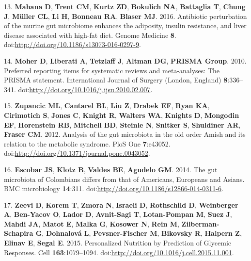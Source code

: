 \documentclass[12pt,]{article}
\begin{document}
13. \textbf{Mahana D}, \textbf{Trent CM}, \textbf{Kurtz ZD},
\textbf{Bokulich NA}, \textbf{Battaglia T}, \textbf{Chung J},
\textbf{Müller CL}, \textbf{Li H}, \textbf{Bonneau RA}, \textbf{Blaser
MJ}. 2016. Antibiotic perturbation of the murine gut microbiome enhances
the adiposity, insulin resistance, and liver disease associated with
high-fat diet. Genome Medicine \textbf{8}.
doi:\url{http://doi.org/10.1186/s13073-016-0297-9}.

14. \textbf{Moher D}, \textbf{Liberati A}, \textbf{Tetzlaff J},
\textbf{Altman DG}, \textbf{PRISMA Group}. 2010. Preferred reporting
items for systematic reviews and meta-analyses: The PRISMA statement.
International Journal of Surgery (London, England) \textbf{8}:336--341.
doi:\url{http://doi.org/10.1016/j.ijsu.2010.02.007}.

15. \textbf{Zupancic ML}, \textbf{Cantarel BL}, \textbf{Liu Z},
\textbf{Drabek EF}, \textbf{Ryan KA}, \textbf{Cirimotich S},
\textbf{Jones C}, \textbf{Knight R}, \textbf{Walters WA},
\textbf{Knights D}, \textbf{Mongodin EF}, \textbf{Horenstein RB},
\textbf{Mitchell BD}, \textbf{Steinle N}, \textbf{Snitker S},
\textbf{Shuldiner AR}, \textbf{Fraser CM}. 2012. Analysis of the gut
microbiota in the old order Amish and its relation to the metabolic
syndrome. PloS One \textbf{7}:e43052.
doi:\url{http://doi.org/10.1371/journal.pone.0043052}.

16. \textbf{Escobar JS}, \textbf{Klotz B}, \textbf{Valdes BE},
\textbf{Agudelo GM}. 2014. The gut microbiota of Colombians differs from
that of Americans, Europeans and Asians. BMC microbiology
\textbf{14}:311. doi:\url{http://doi.org/10.1186/s12866-014-0311-6}.

17. \textbf{Zeevi D}, \textbf{Korem T}, \textbf{Zmora N},
\textbf{Israeli D}, \textbf{Rothschild D}, \textbf{Weinberger A},
\textbf{Ben-Yacov O}, \textbf{Lador D}, \textbf{Avnit-Sagi T},
\textbf{Lotan-Pompan M}, \textbf{Suez J}, \textbf{Mahdi JA},
\textbf{Matot E}, \textbf{Malka G}, \textbf{Kosower N}, \textbf{Rein M},
\textbf{Zilberman-Schapira G}, \textbf{Dohnalová L},
\textbf{Pevsner-Fischer M}, \textbf{Bikovsky R}, \textbf{Halpern Z},
\textbf{Elinav E}, \textbf{Segal E}. 2015. Personalized Nutrition by
Prediction of Glycemic Responses. Cell \textbf{163}:1079--1094.
doi:\url{http://doi.org/10.1016/j.cell.2015.11.001}.
\end{document}
